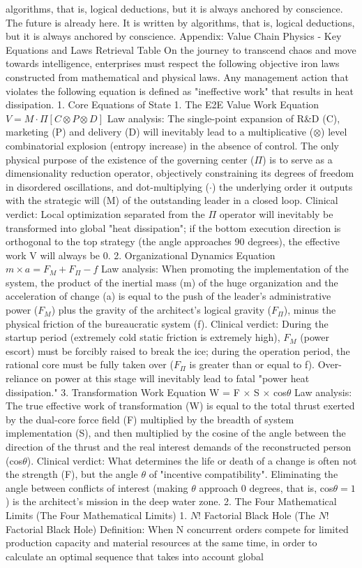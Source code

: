 \documentclass[11pt,a4paper]{article}
\begin{document}
algorithms, that is, logical deductions, but it is always anchored by conscience. The future is already here. It is written by algorithms, that is, logical deductions, but it is always anchored by conscience. Appendix: Value Chain Physics - Key Equations and Laws Retrieval Table On the journey to transcend chaos and move towards intelligence, enterprises must respect the following objective iron laws constructed from mathematical and physical laws. Any management action that violates the following equation is defined as "ineffective work" that results in heat dissipation. 1. Core Equations of State 1. The E2E Value Work Equation $V = M \cdot \Pi [ C \otimes P \otimes D  ]$ Law analysis: The single-point expansion of R\&D (C), marketing (P) and delivery (D) will inevitably lead to a multiplicative ($\otimes$) level combinatorial explosion (entropy increase) in the absence of control. The only physical purpose of the existence of the governing center ($\Pi$) is to serve as a dimensionality reduction operator, objectively constraining its degrees of freedom in disordered oscillations, and dot-multiplying ($\cdot$) the underlying order it outputs with the strategic will (M) of the outstanding leader in a closed loop. Clinical verdict: Local optimization separated from the $\Pi$ operator will inevitably be transformed into global "heat dissipation"; if the bottom execution direction is orthogonal to the top strategy (the angle approaches 90 degrees), the effective work V will always be 0. 2. Organizational Dynamics Equation $m \times a = F_M + F_\Pi - f$ Law analysis: When promoting the implementation of the system, the product of the inertial mass (m) of the huge organization and the acceleration of change (a) is equal to the push of the leader’s administrative power ($F_M$) plus the gravity of the architect’s logical gravity ($F_\Pi$), minus the physical friction of the bureaucratic system (f). Clinical verdict: During the startup period (extremely cold static friction is extremely high), $F_M$ (power escort) must be forcibly raised to break the ice; during the operation period, the rational core must be fully taken over ($F_\Pi$ is greater than or equal to f). Over-reliance on power at this stage will inevitably lead to fatal "power heat dissipation." 3. Transformation Work Equation W = F $\times$ S $\times$ cos$\theta$ Law analysis: The true effective work of transformation (W) is equal to the total thrust exerted by the dual-core force field (F) multiplied by the breadth of system implementation (S), and then multiplied by the cosine of the angle between the direction of the thrust and the real interest demands of the reconstructed person (cos$\theta$). Clinical verdict: What determines the life or death of a change is often not the strength (F), but the angle $\theta$ of "incentive compatibility". Eliminating the angle between conflicts of interest (making $\theta$ approach 0 degrees, that is, cos$\theta = 1$) is the architect's mission in the deep water zone. 2. The Four Mathematical Limits (The Four Mathematical Limits) 1. $N!$ Factorial Black Hole (The $N!$ Factorial Black Hole) Definition: When N concurrent orders compete for limited production capacity and material resources at the same time, in order to calculate an optimal sequence that takes into account global 
\end{document}
